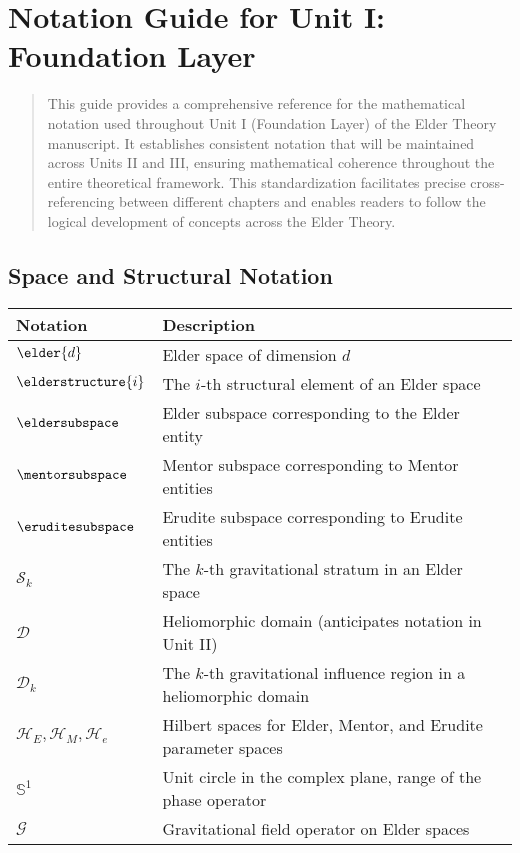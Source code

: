 \chapter*{Notation Guide for Unit I: Foundation Layer}

\begin{abstract}
This guide provides a comprehensive reference for the mathematical notation used throughout Unit I (Foundation Layer) of the Elder Theory manuscript. It establishes consistent notation that will be maintained across Units II and III, ensuring mathematical coherence throughout the entire theoretical framework. This standardization facilitates precise cross-referencing between different chapters and enables readers to follow the logical development of concepts across the Elder Theory.
\end{abstract}

\section*{Space and Structural Notation}

\begin{tabular}{p{}p{}}
\textbf{Notation} & \textbf{Description} \\
\hline
$\elder{d}$ & Elder space of dimension $d$ \\
$\elderstructure{i}$ & The $i$-th structural element of an Elder space \\
$\eldersubspace$ & Elder subspace corresponding to the Elder entity \\
$\mentorsubspace$ & Mentor subspace corresponding to Mentor entities \\
$\eruditesubspace$ & Erudite subspace corresponding to Erudite entities \\
$\mathcal{S}_k$ & The $k$-th gravitational stratum in an Elder space \\
$\mathcal{D}$ & Heliomorphic domain (anticipates notation in Unit II) \\
$\mathcal{D}_k$ & The $k$-th gravitational influence region in a heliomorphic domain \\
$\mathcal{H}_E, \mathcal{H}_M, \mathcal{H}_e$ & Hilbert spaces for Elder, Mentor, and Erudite parameter spaces \\
$\mathbb{S}^1$ & Unit circle in the complex plane, range of the phase operator \\
$\mathcal{G}$ & Gravitational field operator on Elder spaces \\
\hline
\end{tabular}

